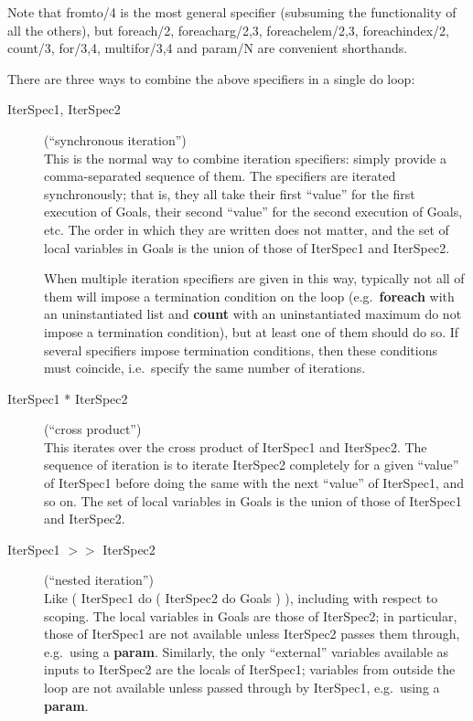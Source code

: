 Note that fromto/4 is the most general specifier (subsuming the
functionality of all the others), but foreach/2, foreacharg/2,3,
foreachelem/2,3, foreachindex/2, count/3, for/3,4, multifor/3,4 and
param/N are convenient shorthands.

There are three ways to combine the above specifiers in a single do loop:

\begin{description}
\item[IterSpec1, IterSpec2] (``synchronous iteration'') \\
%
    This is the normal way to combine iteration specifiers: simply
    provide a comma-separated sequence of them.  The specifiers are
    iterated synchronously; that is, they all take their first
    ``value'' for the first execution of Goals, their second ``value''
    for the second execution of Goals, etc.  The order in which they
    are written does not matter, and the set of local variables in
    Goals is the union of those of IterSpec1 and IterSpec2.

    When multiple iteration specifiers are given in this way,
    typically not all of them will impose a termination condition on
    the loop (e.g.\ {\bf foreach} with an uninstantiated list and {\bf
    count} with an uninstantiated maximum do not impose a termination
    condition), but at least one of them should do so.  If several
    specifiers impose termination conditions, then these conditions
    must coincide, i.e.\ specify the same number of iterations.

\item[IterSpec1 * IterSpec2] (``cross product'') \\
%
    This iterates over the cross product of IterSpec1 and IterSpec2.
    The sequence of iteration is to iterate IterSpec2 completely for a
    given ``value'' of IterSpec1 before doing the same with the next
    ``value'' of IterSpec1, and so on.  The set of local variables in
    Goals is the union of those of IterSpec1 and IterSpec2.

\item[IterSpec1 $>>$ IterSpec2] (``nested iteration'') \\
%
    Like ( IterSpec1 do ( IterSpec2 do Goals ) ), including with
    respect to scoping.  The local variables in Goals are those of
    IterSpec2; in particular, those of IterSpec1 are not available
    unless IterSpec2 passes them through, e.g.\ using a {\bf param}.
    Similarly, the only ``external'' variables available as inputs to
    IterSpec2 are the locals of IterSpec1; variables from outside the
    loop are not available unless passed through by IterSpec1, e.g.\
    using a {\bf param}.
\end{description}

